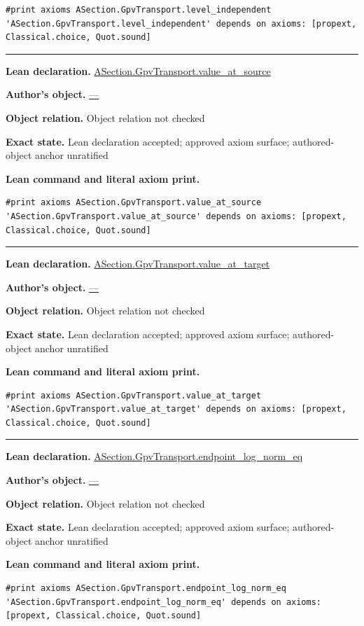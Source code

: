 \documentclass[11pt]{article}
\theoremstyle{plain}
\theoremstyle{definition}
\theoremstyle{remark}
\begin{document}
\begin{tcolorbox}
\begin{Verbatim}[breaklines=true,breakanywhere=true,fontsize=\small]
#print axioms ASection.GpvTransport.level_independent
'ASection.GpvTransport.level_independent' depends on axioms: [propext, Classical.choice, Quot.sound]
\end{Verbatim}
\medskip\hrule\medskip
\textbf{Lean declaration.} \url{ASection.GpvTransport.value_at_source}
\par\textbf{Author's object.} \url{—}
\par\textbf{Object relation.} Object relation not checked
\par\textbf{Exact state.} Lean declaration accepted; approved axiom surface; authored-object anchor unratified
\par\smallskip\textbf{Lean command and literal axiom print.}
\begin{Verbatim}[breaklines=true,breakanywhere=true,fontsize=\small]
#print axioms ASection.GpvTransport.value_at_source
'ASection.GpvTransport.value_at_source' depends on axioms: [propext, Classical.choice, Quot.sound]
\end{Verbatim}
\medskip\hrule\medskip
\textbf{Lean declaration.} \url{ASection.GpvTransport.value_at_target}
\par\textbf{Author's object.} \url{—}
\par\textbf{Object relation.} Object relation not checked
\par\textbf{Exact state.} Lean declaration accepted; approved axiom surface; authored-object anchor unratified
\par\smallskip\textbf{Lean command and literal axiom print.}
\begin{Verbatim}[breaklines=true,breakanywhere=true,fontsize=\small]
#print axioms ASection.GpvTransport.value_at_target
'ASection.GpvTransport.value_at_target' depends on axioms: [propext, Classical.choice, Quot.sound]
\end{Verbatim}
\medskip\hrule\medskip
\textbf{Lean declaration.} \url{ASection.GpvTransport.endpoint_log_norm_eq}
\par\textbf{Author's object.} \url{—}
\par\textbf{Object relation.} Object relation not checked
\par\textbf{Exact state.} Lean declaration accepted; approved axiom surface; authored-object anchor unratified
\par\smallskip\textbf{Lean command and literal axiom print.}
\begin{Verbatim}[breaklines=true,breakanywhere=true,fontsize=\small]
#print axioms ASection.GpvTransport.endpoint_log_norm_eq
'ASection.GpvTransport.endpoint_log_norm_eq' depends on axioms: [propext, Classical.choice, Quot.sound]

\end{Verbatim}
\end{tcolorbox}
\end{document}
